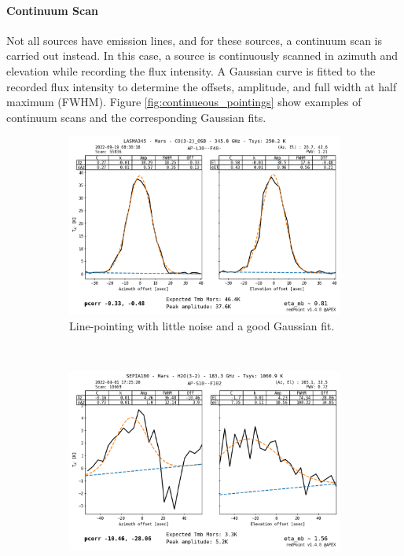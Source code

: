 \paragraph{Continuum Scan}
Not all sources have emission lines, and for these sources, a continuum scan is carried out instead. In this case, a source is continuously scanned in azimuth and elevation while recording the flux intensity.
A Gaussian curve is fitted to the recorded flux intensity to determine the offsets, amplitude, and full width at half maximum (FWHM).
Figure \ref{fig:continueous_pointings} show examples of continuum scans and the corresponding Gaussian fits.

\begin{figure}[H]
    \centering
     \begin{subfigure}[b]{0.75\textwidth}
         \centering
         \includegraphics[width=\textwidth]{Pointing Scans/good_continuous.png}
         \caption{Line-pointing with little noise and a good Gaussian fit.}
         \label{subfig:good_continuous}
     \end{subfigure}
    \\
     \begin{subfigure}[b]{0.75\textwidth}
         \centering
         \includegraphics[width=\textwidth]{Pointing Scans/bad_continuous.png}

\end{subfigure}
\end{figure}
